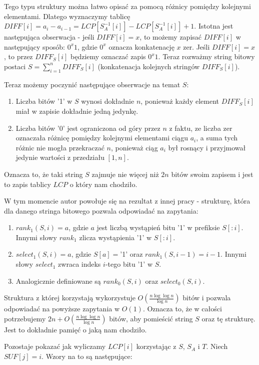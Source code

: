 \documentclass{article}
\begin{document}
Tego typu struktury można łatwo opisać za pomocą różnicy pomiędzy kolejnymi elementami. Dlatego wyznaczymy tablicę $DIFF[i] = a_i - a_{i-1} = LCP[S_A^{-1}[i]] - LCP[S_A^{-1}[i]] + 1$. Istotna jest następująca obserwacja - jeśli $DIFF[i] = x$, to możemy zapisać $DIFF[i]$ w następujący sposób: $0^x1$, gdzie $0^x$ oznacza konkatenację $x$ zer. Jeśli $DIFF[i] = x$, to przez $DIFF_S[i]$ będziemy oznaczać zapis $0^x1$. Teraz rozważmy string bitowy postaci $S = \sum_{i=1}^n DIFF_S[i]$ (konkatenacja kolejnych stringów $DIFF_S[i]$).

Teraz możemy poczynić następujące obserwacje na temat $S$:
\begin{enumerate}
    \item Liczba bitów '1' w $S$ wynosi dokładnie $n$, ponieważ każdy element $DIFF_S[i]$ miał w zapisie dokładnie jedną jedynkę.
    \item Liczba bitów '0' jest ograniczona od góry przez $n$ z faktu, ze liczba zer oznaczała różnicę pomiędzy kolejnymi elementami ciągu $a_i$, a suma tych różnic nie mogła przekraczać $n$, ponieważ ciąg $a_i$ był rosnący i przyjmował jedynie wartości z przedziału $[1,n]$.
\end{enumerate}

Oznacza to, że taki string $S$ zajmuje nie więcej niż $2n$ bitów swoim zapisem i jest to zapis tablicy $LCP$ o który nam chodziło.

W tym momencie autor powołuje się na rezultat z innej pracy - strukturę, która dla danego stringa bitowego pozwala odpowiadać na zapytania:
\begin{enumerate}
    \item $rank_1(S, i) = a$, gdzie $a$ jest liczbą wystąpień bitu '1' w prefiksie $S[:i]$. Innymi słowy $rank_1$ zlicza wystąpienia '1' w $S[:i]$.
    \item $select_1(S, i) = a$, gdzie $S[a] = $'1' oraz $rank_1(S, i-1) = i-1$. Innymi słowy $select_1$ zwraca indeks $i$-tego bitu '1' w $S$.
    \item Analogicznie definiowane są $rank_0(S, i)$ oraz $select_0(S, i)$.
\end{enumerate}

Struktura z której korzystają wykorzystuje $O(\frac{n \log{\log{n}}}{\log{n}})$ bitów i pozwala odpowiadać na powyższe zapytania w $O(1)$. Oznacza to, że w całości potrzebujemy $2n + O(\frac{n \log{\log{n}}}{\log{n}})$ bitów, aby pomieścić string $S$ oraz tę strukturę. Jest to dokładnie pamięć o jaką nam chodziło.

Pozostaje pokazać jak wyliczamy $LCP[i]$ korzystając z $S$, $S_A$ i $T$. Niech $SUF[j] = i$. Wzory na to są następujące:
\end{document}
